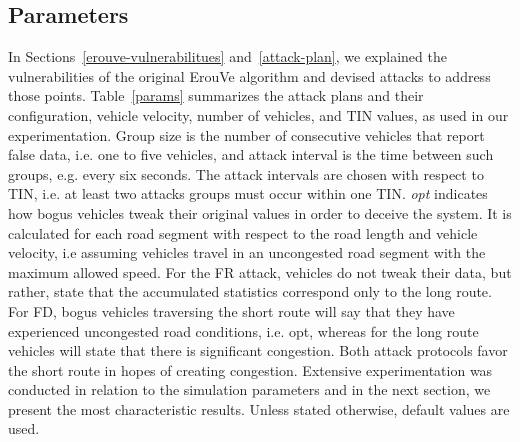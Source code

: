 \documentclass[conference]{IEEEtran}
\begin{document}
\subsection{Parameters}
\label{eval-params}
In Sections~\ref{erouve-vulnerabilitues} and~\ref{attack-plan}, we explained the vulnerabilities of the original ErouVe algorithm and  devised attacks to address those points. Table~\ref{params} summarizes the attack plans and their configuration, vehicle velocity, number of vehicles, and TIN values, as used in our experimentation. Group size is the number of consecutive vehicles that report false data, i.e. one to five vehicles, and attack interval is the time between such groups, e.g. every six seconds. The attack intervals are chosen with respect to TIN, i.e. at least two attacks groups must occur within one TIN. {\it opt} indicates how bogus vehicles tweak their original values in order  to deceive the system. It is calculated for each road segment with respect to the road length and vehicle velocity, i.e assuming vehicles travel in an uncongested road segment with the maximum allowed speed. For the FR attack, vehicles do not tweak their data,
but rather, state that the accumulated statistics correspond only to the long route. For FD, bogus vehicles traversing the short route will say that they have  experienced uncongested road conditions, i.e. opt, whereas for the long route vehicles will state that there is significant congestion. Both attack protocols favor the short route in hopes of creating congestion. Extensive experimentation was conducted in relation to the simulation parameters and in the next section, we present the most characteristic results. Unless stated otherwise, default values are used.
\end{document}
